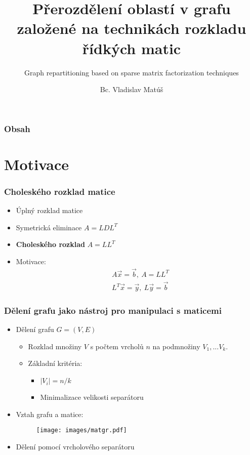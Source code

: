 \documentclass{beamer}
\title[Přerozdělení oblastí v grafu]{Přerozdělení oblastí v grafu založené na technikách rozkladu řídkých matic}
\subtitle{Graph repartitioning based on sparse matrix factorization techniques}
\author{Bc. Vladislav Matúš} %
\institute[FJFI ČVUT]
{
  České vysoké učení technické v Praze \\
  Fakulta jaderná a fyzikálně inženýrská  \\ %
\medskip
Obor Matematická informatika
}
\date{}
\begin{document}
\begin{frame}
	\titlepage
\end{frame}


\begin{frame}
	\only
	\frametitle{Obsah}
	\tableofcontents[]
\end{frame}

	\section{Motivace}

\begin{frame}
  \frametitle{Choleského rozklad matice}	
  \begin{itemize}
    \item Úplný rozklad matice
    \medskip
    \item Symetrická eliminace $A=LDL^T$
    \medskip
    \item \textbf{Choleského rozklad} $A=LL^T$
    \medskip
    \item Motivace:
      \begin{align*}
      &A\vec{x} = \vec{b}, \ A=LL^T    \\
      &L^T\vec{x}=\vec{y}, \ L\vec{y}=\vec{b}
      \end{align*}
  \end{itemize}
\end{frame}

\begin{frame}
  \frametitle{Dělení grafu jako nástroj pro manipulaci s maticemi}
  \begin{itemize}
    \item Dělení grafu $G=(V,E)$ 
    \medskip
    \begin{itemize}
      \item Rozklad množiny $V$ s počtem vrcholů $n$ na podmnožiny $V_1,...V_k$.
      \medskip
      \item Základní kritéria:
      \begin{itemize}
        \item$|V_i| = n/k$
        \item Minimalizace velikosti separátoru
      \end{itemize}
    \end{itemize}
    \medskip
    \item Vztah grafu a matice:
      \begin{figure}
        \texttt{[image: images/matgr.pdf]}
      \end{figure}
    \medskip
    \item Dělení pomocí vrcholového separátoru
  \end{itemize}
\end{frame}
\end{document}
